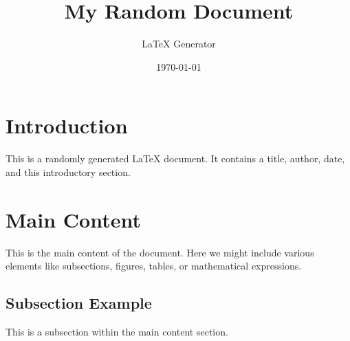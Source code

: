 \documentclass{article}
\title{My Random Document}
\author{LaTeX Generator}
\date{\today}
\begin{document}
\maketitle

\section{Introduction}
This is a randomly generated LaTeX document. It contains a title, author, date, and this introductory section.

\section{Main Content}
This is the main content of the document. Here we might include various elements like subsections, figures, tables, or mathematical expressions.

\subsection{Subsection Example}
This is a subsection within the main content section.
\end{document}
